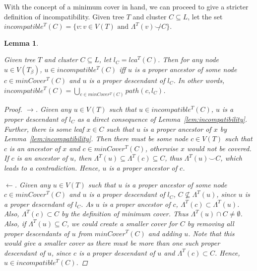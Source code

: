 \documentclass{article}
\newcommand{\compatible}{\smile}
\newcommand{\leafset}{\Lambda}
\newcommand{\TB}{T_\beta}
\newtheorem{incompatibilitymincover}[incompatibility]{Lemma}
\begin{document}
    With the concept of a minimum cover in hand, we can proceed to give a stricter definition of incompatibility. Given tree $T$ and cluster $C \subseteq L$, let the set $incompatible^{T}(C) = \{v : v \in V(T) \text{ and } \leafset^{T}(v) \not\compatible C\}$.
    \newline

    \begin{incompatibilitymincover}
        \label{lem:incompatibilitymincover}

        Given tree $T$ and cluster $C \subseteq L$, let $l_C = lca^{T}(C)$. Then for any node $u \in V(\TB)$, $u \in incompatible^{T}(C)$ iff $u$ is a proper ancestor of some node $c \in minCover^{T}(C)$ and $u$ is a proper descendant of $l_C$. In other words, $incompatible^{T}(C) = \bigcup_{c \in minCover^{T}(C)} path(c, l_C)$.

        \begin{proof}
            $\longrightarrow$. Given any $u \in V(T)$ such that $u \in incompatible^{T}(C)$, $u$ is a proper descendant of $l_C$ as a direct consequence of Lemma~\ref{lem:incompatibility}. Further, there is some leaf $x \in C$ such that $u$ is a proper ancestor of $x$ by Lemma~\ref{lem:incompatibility}. Then there must be some node $c \in V(T)$ such that $c$ is an ancestor of $x$ and $c \in minCover^{T}(C)$, otherwise $x$ would not be covered. If $c$ is an ancestor of $u$, then $\leafset^{T}(u) \subseteq \leafset^{T}(c) \subseteq C$, thus $\leafset^{T}(u) \compatible C$, which leads to a contradiction. Hence, $u$ is a proper ancestor of $c$.

            $\longleftarrow$. Given any $u \in V(T)$ such that $u$ is a proper ancestor of some node $c \in minCover^{T}(C)$ and $u$ is a proper descendant of $l_C$, $C \not\subseteq \leafset^{T}(u)$, since $u$ is a proper descendant of $l_C$. As $u$ is a proper ancestor of $c$, $\leafset^{T}(c) \subset \leafset^{T}(u)$. Also, $\leafset^{T}(c) \subset C$ by the definition of minimum cover. Thus $\leafset^{T}(u) \cap C \neq \emptyset$. Also, if $\leafset^{T}(u) \subseteq C$, we could create a smaller cover for $C$ by removing all proper descendants of $u$ from $minCover^{T}(C)$ and adding $u$. Note that this would give a smaller cover as there must be more than one such proper descendant of $u$, since $c$ is a proper descendant of $u$ and $\leafset^{T}(c) \subset C$. Hence, $u \in incompatible^{T}(C)$.
        \end{proof}
    \end{incompatibilitymincover}
\end{document}

